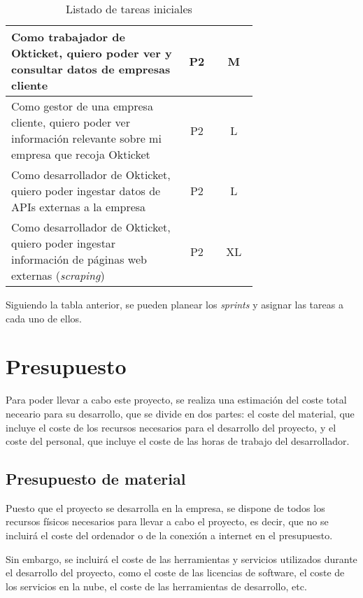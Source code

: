 \begin{table}[H]
\begin{tabular}{|p{0.7\linewidth}|c|c|}
		\hline
		Como trabajador de Okticket, quiero poder ver y consultar datos de empresas cliente & P2\cellcolor{yellow!50} & M\cellcolor{yellow!50} \\
		\hline
		Como gestor de una empresa cliente, quiero poder ver información relevante sobre mi empresa que recoja Okticket & P2\cellcolor{yellow!50} & L\cellcolor{orange!50} \\
		\hline
		Como desarrollador de Okticket, quiero poder ingestar datos de APIs externas a la empresa & P2\cellcolor{yellow!50} & L\cellcolor{orange!50} \\
		\hline
		Como desarrollador de Okticket, quiero poder ingestar información de páginas web externas (\textit{scraping}) & P2\cellcolor{yellow!50} & XL\cellcolor{red!50} \\
		\hline
	\end{tabular}
	\caption{Listado de tareas iniciales}
	\label{tab:initial_tasks}
\end{table}

Siguiendo la tabla anterior, se pueden planear los \textit{sprints} y
asignar las tareas a cada uno de ellos.

\newpage{}
\section{Presupuesto}\label{sec:presupuesto}
Para poder llevar a cabo este proyecto, se realiza una estimación del coste
total neceario para su desarrollo, que se divide en dos partes: el coste del
material, que incluye el coste de los recursos necesarios para el desarrollo del
proyecto, y el coste del personal, que incluye el coste de las horas de trabajo
del desarrollador.

\subsection{Presupuesto de material}\label{subsec:pres_material}
Puesto que el proyecto se desarrolla en la empresa, se dispone de todos los
recursos físicos necesarios para llevar a cabo el proyecto, es decir, que no se
incluirá el coste del ordenador o de la conexión a internet en el presupuesto.

Sin embargo, se incluirá el coste de las herramientas y servicios utilizados
durante el desarrollo del proyecto, como el coste de las licencias de software,
el coste de los servicios en la nube, el coste de las herramientas de
desarrollo, etc.

